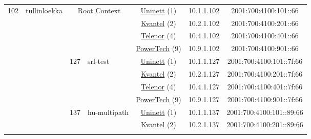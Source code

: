 \begin{small}
\begin{center}
\begin{longtable}{|c|c|c|c|c|c|c|c|}
 \multirow{20}{*}{\tiny{102}} & \multicolumn{1}{|l|}{\multirow{20}{*}{\tiny{tullinloekka}}} & \multicolumn{2}{|c|}{\multirow{4}{*}{\tiny{Root Context}}} & \multicolumn{2}{|c|}{\tiny{\href{https://www.uninett.no}{Uninett} (1)}} & \tiny{10.1.1.102} & \tiny{2001:700:4100:101::66} \\* \cline{5-5}\cline{6-6}\cline{7-7}\cline{8-8}
  &  & \multicolumn{2}{|c|}{} & \multicolumn{2}{|c|}{\tiny{\href{http://kvantel.no}{Kvantel} (2)}} & \tiny{10.2.1.102} & \tiny{2001:700:4100:201::66} \\* \cline{5-5}\cline{6-6}\cline{7-7}\cline{8-8}
  &  & \multicolumn{2}{|c|}{} & \multicolumn{2}{|c|}{\tiny{\href{https://www.telenor.no}{Telenor} (4)}} & \tiny{10.4.1.102} & \tiny{2001:700:4100:401::66} \\* \cline{5-5}\cline{6-6}\cline{7-7}\cline{8-8}
  &  & \multicolumn{2}{|c|}{} & \multicolumn{2}{|c|}{\tiny{\href{http://www.powertech.no}{PowerTech} (9)}} & \tiny{10.9.1.102} & \tiny{2001:700:4100:901::66} \\* \cline{3-3}\cline{4-4}\cline{5-5}\cline{6-6}\cline{7-7}\cline{8-8}
  &  & \multirow{4}{*}{\tiny{127}} & \multicolumn{1}{|l|}{\multirow{4}{*}{\tiny{srl-test}}} & \multicolumn{2}{|c|}{\tiny{\href{https://www.uninett.no}{Uninett} (1)}} & \tiny{10.1.1.127} & \tiny{2001:700:4100:101::7f:66} \\* \cline{5-5}\cline{6-6}\cline{7-7}\cline{8-8}
  &  &  &  & \multicolumn{2}{|c|}{\tiny{\href{http://kvantel.no}{Kvantel} (2)}} & \tiny{10.2.1.127} & \tiny{2001:700:4100:201::7f:66} \\* \cline{5-5}\cline{6-6}\cline{7-7}\cline{8-8}
  &  &  &  & \multicolumn{2}{|c|}{\tiny{\href{https://www.telenor.no}{Telenor} (4)}} & \tiny{10.4.1.127} & \tiny{2001:700:4100:401::7f:66} \\* \cline{5-5}\cline{6-6}\cline{7-7}\cline{8-8}
  &  &  &  & \multicolumn{2}{|c|}{\tiny{\href{http://www.powertech.no}{PowerTech} (9)}} & \tiny{10.9.1.127} & \tiny{2001:700:4100:901::7f:66} \\* \cline{3-3}\cline{4-4}\cline{5-5}\cline{6-6}\cline{7-7}\cline{8-8}
  &  & \multirow{4}{*}{\tiny{137}} & \multicolumn{1}{|l|}{\multirow{4}{*}{\tiny{hu-multipath}}} & \multicolumn{2}{|c|}{\tiny{\href{https://www.uninett.no}{Uninett} (1)}} & \tiny{10.1.1.137} & \tiny{2001:700:4100:101::89:66} \\* \cline{5-5}\cline{6-6}\cline{7-7}\cline{8-8}
  &  &  &  & \multicolumn{2}{|c|}{\tiny{\href{http://kvantel.no}{Kvantel} (2)}} & \tiny{10.2.1.137} & \tiny{2001:700:4100:201::89:66} \\* \cline{5-5}\cline{6-6}\cline{7-7}\cline{8-8}

\end{longtable}
\end{center}
\end{small}
